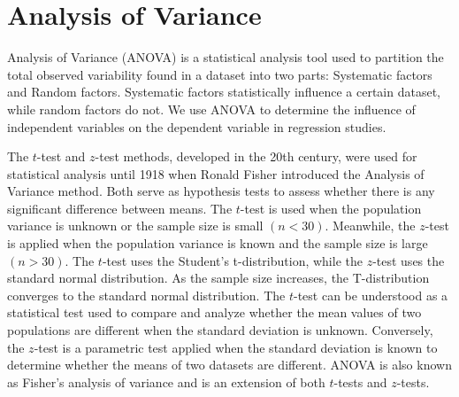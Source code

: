 

\section{Analysis of Variance}

Analysis of Variance (ANOVA) is a statistical analysis tool used to partition the total observed variability found in a dataset into two parts: Systematic factors and Random factors. Systematic factors statistically influence a certain dataset, while random factors do not. We use ANOVA to determine the influence of independent variables on the dependent variable in regression studies.

The $t$-test and $z$-test methods, developed in the 20th century, were used for statistical analysis until 1918 when Ronald Fisher introduced the Analysis of Variance method. Both serve as hypothesis tests to assess whether there is any significant difference between means. The $t$-test is used when the population variance is unknown or the sample size is small $(n < 30)$. Meanwhile, the $z$-test is applied when the population variance is known and the sample size is large $(n > 30)$. The $t$-test uses the Student's t-distribution, while the $z$-test uses the standard normal distribution. As the sample size increases, the T-distribution converges to the standard normal distribution. The $t$-test can be understood as a statistical test used to compare and analyze whether the mean values of two populations are different when the standard deviation is unknown. Conversely, the $z$-test is a parametric test applied when the standard deviation is known to determine whether the means of two datasets are different. ANOVA is also known as Fisher's analysis of variance and is an extension of both $t$-tests and $z$-tests.


